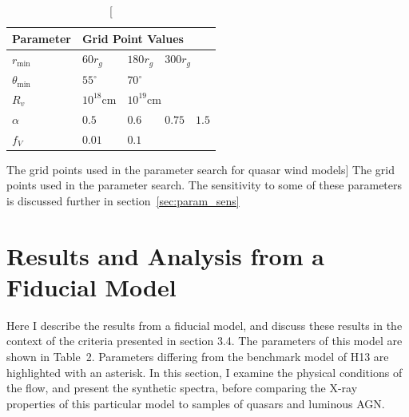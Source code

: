 \begin{table}
\centering
\begin{tabular}{p{2cm}p{1cm}p{1cm}p{1cm}p{1cm}}
Parameter & \multicolumn{4}{l}{Grid Point Values}  \\
\hline \hline 
$r_{\mathrm{min}}$ 	&	 $60r_{g}$ & $180r_{g}$ & \multicolumn{2}{l}{$300r_{g}$} \\ 
$\theta_{\mathrm{min}}$ 	& $55^{\circ}$ & \multicolumn{3}{l}{$70^{\circ}$} \\ 
$R_v$  	        &	 $10^{18}$cm & \multicolumn{3}{l}{$10^{19}$cm} \\ 
$\alpha$ 	&	 $0.5$ & $0.6$ & $0.75$ & $1.5$ \\
$f_V$ 	&	 $0.01$ & \multicolumn{3}{l}{$0.1$}  \\
\hline 
\end{tabular}
\caption
[The grid points used in the parameter search for quasar wind models]
{The grid points used in the parameter search.
The sensitivity to some of these parameters is discussed 
further in section~\ref{sec:param_sens}}
\label{grid_table}
\end{table}







\section{Results and Analysis from a Fiducial Model}
\label{sec:qso_results}
Here I describe the results from a fiducial model,
and discuss these results in the context of the criteria 
presented in section 3.4. The parameters of this model are shown in Table~2.
Parameters differing from the benchmark model of H13 are 
highlighted with an asterisk. In this section, I examine the physical 
conditions of the flow, and present the synthetic spectra, before comparing
the X-ray properties of this particular model to samples of
quasars and luminous AGN. 

